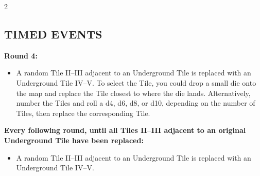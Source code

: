 \begin{multicols*}{2}
\subsection*{\MakeUppercase{Timed Events}}
\textbf{Round 4:}
\begin{itemize}
\item A random Tile II--III adjacent to an Underground Tile is replaced with an Underground Tile IV--V. To select the Tile, you could drop a small die onto the map and replace the Tile closest to where the die lands. Alternatively, number the Tiles and roll a d4, d6, d8, or d10, depending on the number of Tiles, then replace the corresponding Tile.
\end{itemize}
\textbf{Every following round, until all Tiles II--III adjacent to an original Underground Tile have been replaced:}
\begin{itemize}
\item A random Tile II--III adjacent to an Underground Tile is replaced with an Underground Tile IV--V.
\end{itemize}


\end{multicols*}
